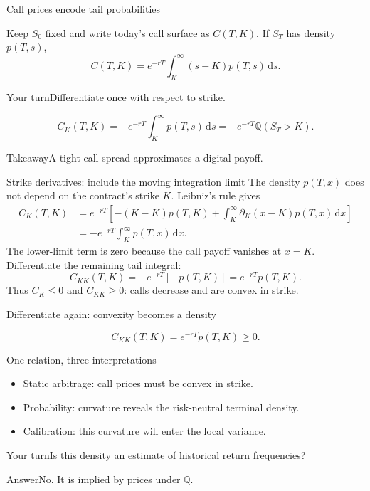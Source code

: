 \documentclass[handout,10pt,t,aspectratio=169]{beamer}
\newenvironment{pausebox}{\begin{block}{Your turn}}{\end{block}}
\newenvironment{answerbox}{\begin{exampleblock}{Answer}}{\end{exampleblock}}
\newenvironment{keybox}{\begin{exampleblock}{Takeaway}}{\end{exampleblock}}
\newcommand{\Q}{\mathbb Q}
\newcommand{\dd}{\,\mathrm d}
\begin{document}
\begin{frame}{Call prices encode tail probabilities}

    Keep \(S_0\) fixed and write today's call surface as \(C(T,K)\).
    If \(S_T\) has density \(p(T,s)\),
    \[C(T,K)=e^{-rT}\int_K^\infty(s-K)p(T,s)\dd s.\]
    \begin{pausebox}Differentiate once with respect to strike.\end{pausebox}

    \[\boxed{C_K(T,K)=-e^{-rT}\int_K^\infty p(T,s)\dd s
                  =-e^{-rT}\Q(S_T>K).}\]
    \begin{keybox}A tight call spread approximates a digital payoff.\end{keybox}
\end{frame}

\begin{frame}{Strike derivatives: include the moving integration limit}
\small
The density \(p(T,x)\) does not depend on the contract's strike \(K\).
Leibniz's rule gives
\[
\begin{aligned}
C_K(T,K)
&=e^{-rT}\left[-(K-K)p(T,K)
+\int_K^\infty\partial_K(x-K)p(T,x)\dd x\right]\\
&=-e^{-rT}\int_K^\infty p(T,x)\dd x.
\end{aligned}
\]
The lower-limit term is zero because the call payoff vanishes at \(x=K\).
Differentiate the remaining tail integral:
\[
\boxed{C_{KK}(T,K)=-e^{-rT}[-p(T,K)]
=e^{-rT}p(T,K).}
\]
Thus \(C_K\leq0\) and \(C_{KK}\geq0\): calls decrease and are convex in strike.
\end{frame}

\begin{frame}{Differentiate again: convexity becomes a density}

    \[\boxed{C_{KK}(T,K)=e^{-rT}p(T,K)\geq0.}\]
    \begin{block}{One relation, three interpretations}
    \begin{itemize}
    \item Static arbitrage: call prices must be convex in strike.
    \item Probability: curvature reveals the risk-neutral terminal density.
    \item Calibration: this curvature will enter the local variance.
    \end{itemize}\end{block}
    \begin{pausebox}Is this density an estimate of historical return frequencies?\end{pausebox}
    \begin{answerbox}No. It is implied by prices under \(\Q\).\end{answerbox}
\end{frame}
\end{document}
